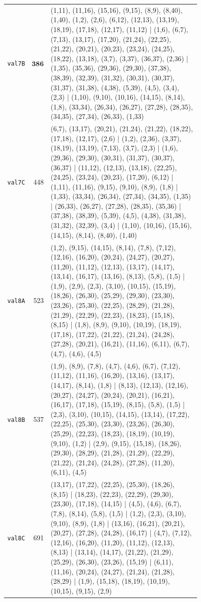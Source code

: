 \begin{landscape}
\begin{longtable}{lr>{\tiny\raggedright\arraybackslash}p{0.78\linewidth}}
\texttt{val7B} & $\mathbf{386}$ & (1,11), (11,16), (15,16), (9,15), (8,9), (8,40), (1,40), (1,2), (2,6), (6,12), (12,13), (13,19), (18,19), (17,18), (12,17), (11,12) | (1,6), (6,7), (7,13), (13,17), (17,20), (21,24), (22,25), (21,22), (20,21), (20,23), (23,24), (24,25), (18,22), (13,18), (3,7), (3,37), (36,37), (2,36) | (1,35), (35,36), (29,36), (29,30), (37,38), (38,39), (32,39), (31,32), (30,31), (30,37), (31,37), (31,38), (4,38), (5,39), (4,5), (3,4), (2,3) | (1,10), (9,10), (10,16), (14,15), (8,14), (1,8), (33,34), (26,34), (26,27), (27,28), (28,35), (34,35), (27,34), (26,33), (1,33) \\[2pt]
\texttt{val7C} & 448 & (6,7), (13,17), (20,21), (21,24), (21,22), (18,22), (17,18), (12,17), (2,6) | (1,2), (2,36), (3,37), (18,19), (13,19), (7,13), (3,7), (2,3) | (1,6), (29,36), (29,30), (30,31), (31,37), (30,37), (36,37) | (11,12), (12,13), (13,18), (22,25), (24,25), (23,24), (20,23), (17,20), (6,12) | (1,11), (11,16), (9,15), (9,10), (8,9), (1,8) | (1,33), (33,34), (26,34), (27,34), (34,35), (1,35) | (26,33), (26,27), (27,28), (28,35), (35,36) | (37,38), (38,39), (5,39), (4,5), (4,38), (31,38), (31,32), (32,39), (3,4) | (1,10), (10,16), (15,16), (14,15), (8,14), (8,40), (1,40) \\[2pt]
\texttt{val8A} & 523 & (1,2), (9,15), (14,15), (8,14), (7,8), (7,12), (12,16), (16,20), (20,24), (24,27), (20,27), (11,20), (11,12), (12,13), (13,17), (14,17), (13,14), (16,17), (13,16), (8,13), (5,8), (1,5) | (1,9), (2,9), (2,3), (3,10), (10,15), (15,19), (18,26), (26,30), (25,29), (29,30), (23,30), (23,26), (25,30), (22,25), (28,29), (21,28), (21,29), (22,29), (22,23), (18,23), (15,18), (8,15) | (1,8), (8,9), (9,10), (10,19), (18,19), (17,18), (17,22), (21,22), (21,24), (24,28), (27,28), (20,21), (16,21), (11,16), (6,11), (6,7), (4,7), (4,6), (4,5) \\[2pt]
\texttt{val8B} & 537 & (1,9), (8,9), (7,8), (4,7), (4,6), (6,7), (7,12), (11,12), (11,16), (16,20), (13,16), (13,17), (14,17), (8,14), (1,8) | (8,13), (12,13), (12,16), (20,27), (24,27), (20,24), (20,21), (16,21), (16,17), (17,18), (15,19), (8,15), (5,8), (1,5) | (2,3), (3,10), (10,15), (14,15), (13,14), (17,22), (22,25), (25,30), (23,30), (23,26), (26,30), (25,29), (22,23), (18,23), (18,19), (10,19), (9,10), (1,2) | (2,9), (9,15), (15,18), (18,26), (29,30), (28,29), (21,28), (21,29), (22,29), (21,22), (21,24), (24,28), (27,28), (11,20), (6,11), (4,5) \\[2pt]
\texttt{val8C} & 691 & (13,17), (17,22), (22,25), (25,30), (18,26), (8,15) | (18,23), (22,23), (22,29), (29,30), (23,30), (17,18), (14,15) | (4,5), (4,6), (6,7), (7,8), (8,14), (5,8), (1,5) | (1,2), (2,3), (3,10), (9,10), (8,9), (1,8) | (13,16), (16,21), (20,21), (20,27), (27,28), (24,28), (16,17) | (4,7), (7,12), (12,16), (16,20), (11,20), (11,12), (12,13), (8,13) | (13,14), (14,17), (21,22), (21,29), (25,29), (26,30), (23,26), (15,19) | (6,11), (11,16), (20,24), (24,27), (21,24), (21,28), (28,29) | (1,9), (15,18), (18,19), (10,19), (10,15), (9,15), (2,9) \\[2pt]

\end{longtable}
\end{landscape}
